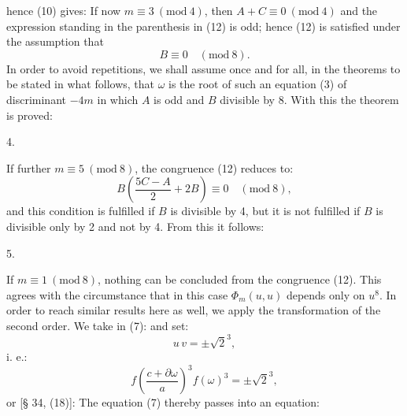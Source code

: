 
hence (10) gives:
If now $m \equiv 3\ (\mathrm{mod}\ 4)$, then $A + C \equiv 0\ (\mathrm{mod}\ 4)$ and the expression standing in the parenthesis in (12) is odd; hence (12) is satisfied  under the assumption that
\[
B \equiv 0 \quad (\mathrm{mod}\ 8).
\]
In order to avoid repetitions, we shall assume once and for all, in the theorems to be stated in what follows, that $\omega$ is the root of such an equation (3) of discriminant $-4m$ in which $A$ is odd and $B$ divisible by 8. With this the theorem is proved:

4. 

If further $m \equiv 5\ (\mathrm{mod}\ 8)$, the congruence (12) reduces to:
\[
B\left(\frac{5C - A}{2} + 2B\right) \equiv 0 \quad (\mathrm{mod}\ 8),
\]
and this condition is fulfilled if $B$ is divisible by 4, but it is not fulfilled if $B$ is divisible only by 2 and not by 4. From this it follows:

5. 

If $m \equiv 1\ (\mathrm{mod}\ 8)$, nothing can be concluded from the congruence (12). This agrees with the circumstance that in this case $\Phi_m(u, u)$ depends only on $u^8$. In order to reach similar results here as well, we apply the transformation of the second order. We take in (7):
and set:
\[
u\,v = \pm \sqrt{2}^{3},
\]
i. e.:
\[
f\left(\frac{c + \partial\omega}{a}\right)^{3} f(\omega)^{3} = \pm \sqrt{2}^{3},
\]
or [§ 34, (18)]:
The equation (7) thereby passes into an equation:

